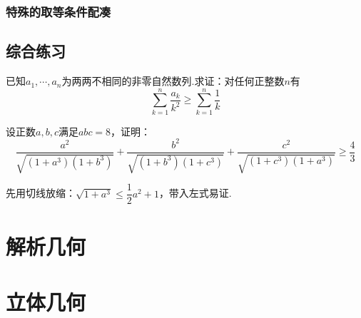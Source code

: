 \documentclass[cn,hazy,black,10pt,normal]{elegantnote}
\begin{document}
\subsection{特殊的取等条件配凑}

\section{综合练习}

\begin{problem} %
	已知$a_1, \cdots ,a_n$为两两不相同的非零自然数列.求证：对任何正整数$n$有$$\sum_{k=1}^{n} \frac{a_k}{k^2} \geq \sum_{k=1}^{n} \frac{1}{k}$$
\end{problem}
\begin{solution}
\end{solution}

\begin{problem} %
	设正数$a,b,c$满足$abc=8$，证明：$$\frac{a^2}{\sqrt{(1+a^3)(1+b^3)}} + \frac{b^2}{\sqrt{(1+b^3)(1+c^3)}} + \frac{c^2}{\sqrt{(1+c^3)(1+a^3)}} \geq \frac{4}{3}$$
\end{problem}
\begin{solution}
	先用切线放缩：$\sqrt{1+a^3} \leq \dfrac{1}{2}a^2+1$，带入左式易证.
\end{solution}

\chapter{解析几何}

\chapter{立体几何}
\end{document}
